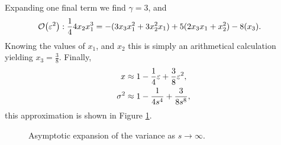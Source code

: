 Expanding one final term we find $\gamma = 3$, and
\begin{align*}
\bigO{\eps^2}: \frac{1}{4} 4x_2 x_1^3 &= -(3x_3 x_1^2 + 3x_2^2 x_1) + 5(2x_3 x_1 + x_2^2) - 8(x_3).
\end{align*}
Knowing the values of $x_1$, and $x_2$ this is simply an arithmetical calculation yielding $x_3 = \frac{3}{8}$. Finally,
\begin{align*}
x &\approx 1 - \frac{1}{4}\varepsilon + \frac{3}{8}\varepsilon^2, \\
\sigma^2 &\approx 1 - \frac{1}{4s^4} + \frac{3}{8s^8},
\end{align*}
this approximation is shown in Figure \ref{fig:limsinfty}.
\begin{figure}[tbp]

\caption{Asymptotic expansion of the variance as $s \rightarrow \infty$.}
\label{fig:limsinfty}
\end{figure}









